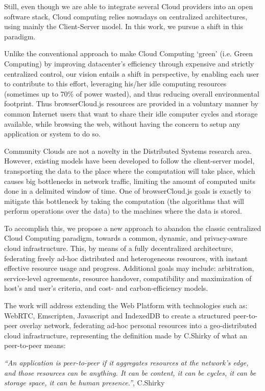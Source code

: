 Still, even though we are able to integrate several Cloud providers into an open software stack, Cloud computing relies nowadays on centralized architectures, using mainly the Client-Server model. In this work, we pursue a shift in this paradigm.

Unlike the conventional approach to make Cloud Computing `green' (i.e. Green Computing) by improving datacenter's efficiency through expensive and strictly centralized control, our vision entails a shift in perspective, by enabling each user to contribute to this effort, leveraging his/her idle computing resources (sometimes up to 70\% of power wasted), and thus reducing overall environmental footprint. Thus browserCloud.js resources are provided in a voluntary manner by common Internet users that want to share their idle computer cycles and storage available, while browsing the web, without having the concern to setup any application or system to do so.

Community Clouds are not a novelty in the Distributed Systems research area. However, existing models have been developed to follow the client-server model, transporting the data to the place where the computation will take place, which causes big bottlenecks in network traffic, limiting the amount of computed units done in a delimited window of time. One of browserCloud.js goals is exactly to mitigate this bottleneck by taking the computation (the algorithms that will perform operations over the data) to the machines where the data is stored.

To accomplish this, we propose a new approach to abandon the classic centralized Cloud Computing paradigm, towards a common, dynamic, and privacy-aware cloud infrastructure. This, by means of a fully decentralized architecture, federating freely ad-hoc distributed and heterogeneous resources, with instant effective resource usage and progress. Additional goals may include: arbitration, service-level agreements, resource handover, compatibility and maximization of host's and user's criteria, and cost- and carbon-efficiency models.

The work will address extending the Web Platform with technologies such as: WebRTC, Emscripten, Javascript and IndexedDB to create a structured peer-to-peer overlay network, federating ad-hoc personal resources into a geo-distributed cloud infrastructure, representing the definition made by C.Shirky of what an peer-to-peer means:

  \textit{``An application is peer-to-peer if it aggregates resources at the network’s edge, and those resources can be anything. It can be content, it can be cycles, it can be storage space, it can be human presence.''}, C.Shirky \cite{Shirky.}

